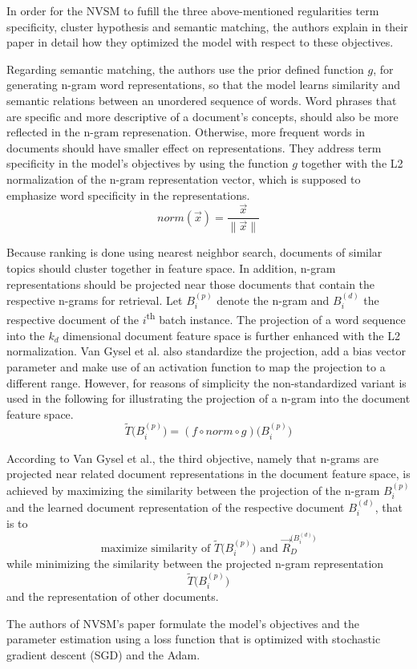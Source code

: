 In order for the NVSM to fufill the three above-mentioned regularities
    term specificity, cluster hypothesis and semantic matching,
    the authors explain in their paper in detail how they optimized 
    the model with respect to these objectives.

Regarding semantic matching, the authors use the prior defined function $g$, 
    for generating n-gram word representations,
    so that the model learns similarity and semantic relations
    between an unordered sequence of words.
Word phrases that are specific and more descriptive of a document's concepts, 
    should also be more reflected in the n-gram represenation.
Otherwise, more frequent words in documents should have smaller effect on 
    representations.
They address term specificity in the model's objectives by using the 
    function $g$ together with the L2 normalization 
    of the n-gram representation vector, which is supposed to 
    emphasize word specificity in the representations.
\[
norm(\vec{x}) = \frac{\vec{x}}{\|\vec{x}\|}
\]

Because ranking is done using nearest neighbor search, 
    documents of similar topics should cluster together in feature space.
In addition, n-gram representations should be projected near those 
    documents that contain the respective n-grams for retrieval.
Let $B_i^{(p)}$ denote the n-gram and $B_i^{(d)}$ the respective document 
    of the $i$\textsuperscript{th} batch instance.
The projection of a word sequence into the $k_d$ dimensional document
    feature space is further enhanced with the L2 normalization.
Van Gysel et al. also standardize the projection, add a bias vector parameter
    and make use of an activation function to map the projection to a different 
    range.
However, for reasons of simplicity the non-standardized variant is used in the 
    following for illustrating the projection of a n-gram into the document 
    feature space.
\[
\widetilde{T}\Big(B_i^{(p)}\Big) = (f \circ norm \circ g) \Big(B_i^{(p)} \Big)
\]

According to Van Gysel et al., the third objective, 
    namely that n-grams are projected near related document representations 
    in the document feature space, is achieved by maximizing the similarity between 
    the projection of the n-gram $B_i^{(p)}$ and the learned 
    document representation of the respective document $B_i^{(d)}$,
    that is to
    \[
    \textrm{maximize similarity of }\widetilde{T}\Big(B_i^{(p)}\Big) \textrm{ and } \vec{R}_D^{\big(B_i^{(d)}\big)}
    \]
    while minimizing the similarity between the projected n-gram representation
    \[
    \widetilde{T}\Big(B_i^{(p)}\Big)
    \]
    and the representation of other documents.

The authors of NVSM's paper formulate the model's objectives and
    the parameter estimation using a loss function 
    that is optimized with stochastic gradient descent (SGD)
    and the Adam.
    \cite{van-gysel:2017:neural-vector-spaces}



